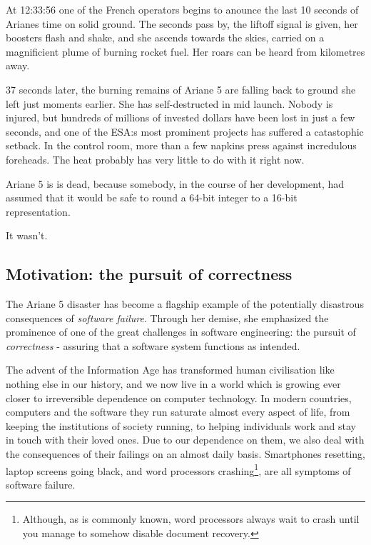 \documentclass{article}
\newcommand{\tmem}[1]{{\em #1\/}}
\begin{document}
At 12:33:56 one of the French operators begins to anounce the last 10 seconds
of Arianes time on solid ground. The seconds pass by, the liftoff signal is
given, her boosters flash and shake, and she ascends towards the skies,
carried on a magnificient plume of burning rocket fuel. Her roars can be heard
from kilometres away.



37 seconds later, the burning remains of Ariane 5 are falling back to ground
she left just moments earlier. She has self-destructed in mid launch. Nobody
is injured, but hundreds of millions of invested dollars have been lost in
just a few seconds, and one of the ESA:s most prominent projects has suffered
a catastophic setback. In the control room, more than a few napkins press
against incredulous foreheads. The heat probably has very little to do with it
right now.



Ariane 5 is is dead, because somebody, in the course of her development, had
assumed that it would be safe to round a 64-bit integer to a 16-bit
representation.



It wasn't. \

\subsection{Motivation: the pursuit of correctness}

The Ariane 5 disaster
{\cite{jazequel1997design}}{\cite{dowson1997ariane}}{\cite{lions1996ariane}}
has become a flagship example of the potentially disastrous consequences of
{\tmem{software failure}}. Through her demise, she emphasized the prominence
of one of the great challenges in software engineering: the pursuit of
{\tmem{correctness}} - assuring that a software system functions as intended.



The advent of the Information Age has transformed human civilisation like
nothing else in our history, and we now live in a world which is growing ever
closer to irreversible dependence on computer technology. In modern countries,
computers and the software they run saturate almost every aspect of life, from
keeping the institutions of society running, to helping individuals work and
stay in touch with their loved ones. Due to our dependence on them, we also
deal with the consequences of their failings on an almost daily basis.
Smartphones resetting, laptop screens going black, and word processors
crashing{\footnote{Although, as is commonly known, word processors always wait
to crash until you manage to somehow disable document recovery.}}, are all
symptoms of software failure.
\end{document}
